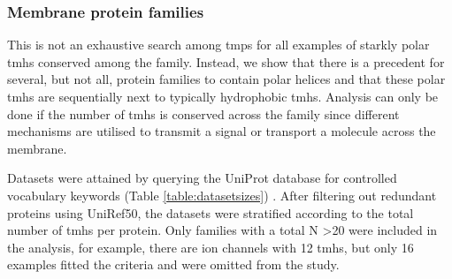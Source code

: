 \subsubsection{Membrane protein families}
This is not an exhaustive search among \gls{tmp}s for all examples of starkly polar \gls{tmh}s conserved among the family.
Instead, we show that there is a precedent for several, but not all, protein families to contain polar helices and that these polar \gls{tmh}s are sequentially next to typically hydrophobic \gls{tmh}s.
Analysis can only be done if the number of \gls{tmh}s is conserved across the family since different mechanisms are utilised to transmit a signal or transport a molecule across the membrane.

Datasets were attained by querying the UniProt database for controlled vocabulary keywords (Table \ref{table:datasetsizes}) \cite{TheUniProtConsortium2014}.
After filtering out redundant proteins using UniRef50, the datasets were stratified according to the total number of \gls{tmh}s per protein.
Only families with a total N \textgreater 20 were included in the analysis, for example, there are ion channels with 12 \gls{tmh}s, but only 16 examples fitted the criteria and were omitted from the study.



